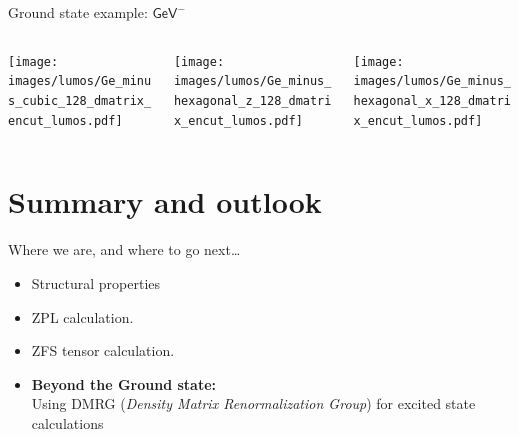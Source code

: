 \documentclass[notes=show]{beamer}
\begin{document}
  
\begin{frame}{Ground state example: $ \mathsf{GeV}^{-} $ }
  \begin{center}
    \begin{columns}
      \begin{column}{0.3\textwidth}
        \texttt{[image: images/lumos/Ge\_minus\_cubic\_128\_dmatrix\_encut\_lumos.pdf]}
      \end{column}
      \begin{column}{0.3\textwidth}
        \texttt{[image: images/lumos/Ge\_minus\_hexagonal\_z\_128\_dmatrix\_encut\_lumos.pdf]}
      \end{column}
      \begin{column}{0.3\textwidth}
        \texttt{[image: images/lumos/Ge\_minus\_hexagonal\_x\_128\_dmatrix\_encut\_lumos.pdf]}
      \end{column}
    \end{columns}
  \end{center}
\end{frame}



\section{Summary and outlook} %




\begin{frame}{Where we are, and where to go next\ldots}
  \begin{itemize}
    \item Structural properties
    \item ZPL calculation.
    \item ZFS tensor calculation.
    \item \textbf{Beyond the Ground state:}\\
      Using DMRG (\textit{Density Matrix Renormalization Group}) for excited state calculations
  \end{itemize}
\end{frame}
\end{document}
